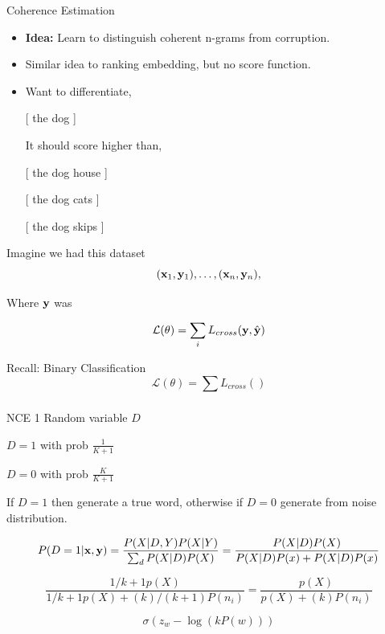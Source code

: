 \documentclass{beamer}
\begin{document}
\begin{frame}{Coherence Estimation }
  \begin{itemize}
  \item \textbf{Idea:} Learn to distinguish coherent n-grams from 
    corruption. 
    \air 
 
  \item Similar idea to ranking embedding, but no score function. 

  \item Want to differentiate,

    \begin{center}
      [ the dog  ]
    \end{center}
    
    
    
    It should score higher than,
    \begin {center}
      [ the dog \alert{house}  ]
      
      [ the dog \alert{cats}  ]
      
      [ the dog \alert{skips}  ]
      
    \end{center}
  \end{itemize}
\end{frame}

\begin{frame}{}
  Imagine we had this dataset 
  \[ (\mathbf{x}_1, \mathbf{y}_1),\ldots, (\mathbf{x}_n, \mathbf{y}_n), \]
  
  Where $\mathbf{y}$ was 

  \[ \mathcal{L}(\theta) = \sum_{i} L_{cross}(\mathbf{y}, \hat{\mathbf{y}}) \] 

\end{frame}

\begin{frame}{Recall: Binary Classification}
  \[ \mathcal{L}(\theta) = \sum_{} L_{cross}() \]   
\end{frame}



\begin{frame}{NCE 1}
  Random variable $D$

  $D=1$ with prob $\frac{1}{K+1}$

  $D=0$ with prob $\frac{K}{K+1}$
  
  If $D=1$ then generate a true word, otherwise if $D=0$ generate from noise distribution. 
\end{frame}

\begin{frame}
  \[P(D=1 | \mathbf{x}, \mathbf{y}) =  \frac{P(X|D, Y) P(X| Y)}{\sum_{d} P(X|D) P(X) } =  \frac{P(X|D) P(X)}{P(X|D)P(x) +  P(X|D) P(x) }\] 

  \[  \frac{1/{k+1} p(X)}{1/{k+1} p(X) + (k)/(k+1) P(n_i) } = \frac{p(X)}{p(X) + (k) P(n_i) } \]

  \[ \sigma(z_w - \log(k P(w))) \]
\end{frame}
\end{document}
